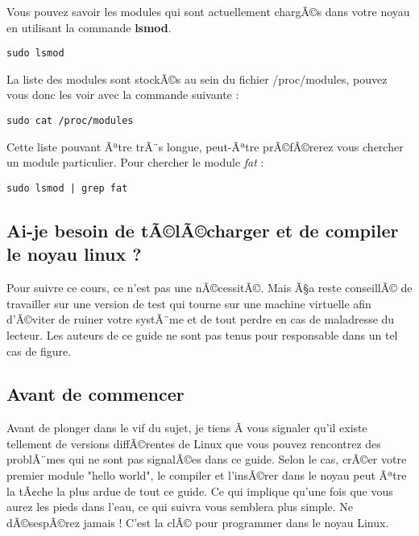 \documentclass[11pt]{article}
\begin{document}
Vous pouvez savoir les modules qui sont actuellement chargÃ©s dans votre noyau en utilisant la commande \textbf{lsmod}.

\begin{verbatim}
sudo lsmod
\end{verbatim}

La liste des modules sont stockÃ©s au sein du fichier /proc/modules, pouvez vous donc les voir avec la commande suivante :

\begin{verbatim}
sudo cat /proc/modules
\end{verbatim}

Cette liste pouvant Ãªtre trÃ¨s longue, peut-Ãªtre prÃ©fÃ©rerez vous chercher un module particulier. Pour chercher le module \emph{fat} :

\begin{verbatim}
sudo lsmod | grep fat
\end{verbatim}

\subsection*{Ai-je besoin de tÃ©lÃ©charger et de compiler le noyau linux ?}
\label{sec-1-7}

Pour suivre ce cours, ce n'est pas une nÃ©cessitÃ©. Mais Ã§a reste conseillÃ© de travailler sur une version de test qui tourne sur une machine virtuelle afin d'Ã©viter de ruiner votre systÃ¨me et de tout perdre en cas de maladresse du lecteur. Les auteurs de ce guide ne sont pas tenus pour responsable dans un tel cas de figure.

\subsection*{Avant de commencer}
\label{sec-1-8}

Avant de plonger dans le vif du sujet, je tiens Ã  vous signaler qu'il existe tellement de versions diffÃ©rentes de Linux que vous pouvez rencontrez des problÃ¨mes qui ne sont pas signalÃ©es dans ce guide. Selon le cas, crÃ©er votre premier module "hello world", le compiler et l'insÃ©rer dans le noyau peut Ãªtre la tÃ¢che la plus ardue de tout ce guide. Ce qui implique qu'une fois que vous aurez les pieds dans l'eau, ce qui suivra vous semblera plus simple. Ne dÃ©sespÃ©rez jamais ! C'est la clÃ© pour programmer dans le noyau Linux.
\end{document}
